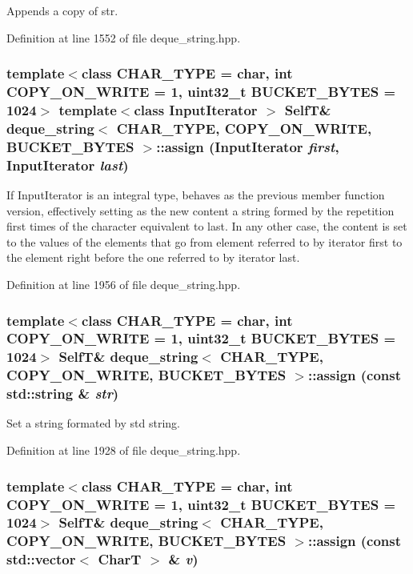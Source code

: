 Appends a copy of str. 

Definition at line 1552 of file deque\_\-string.hpp.\hypertarget{classdeque__string_c5b8af527d69203338e2450164dbdd8c}{
\subsubsection[{assign}]{\setlength{\rightskip}{0pt plus 5cm}template$<$class CHAR\_\-TYPE  = char, int COPY\_\-ON\_\-WRITE = 1, uint32\_\-t BUCKET\_\-BYTES = 1024$>$ template$<$class InputIterator $>$ {\bf SelfT}\& {\bf deque\_\-string}$<$ CHAR\_\-TYPE, COPY\_\-ON\_\-WRITE, BUCKET\_\-BYTES $>$::assign (InputIterator {\em first}, \/  InputIterator {\em last})}}
\label{classdeque__string_c5b8af527d69203338e2450164dbdd8c}


If InputIterator is an integral type, behaves as the previous member function version, effectively setting as the new content a string formed by the repetition first times of the character equivalent to last. In any other case, the content is set to the values of the elements that go from element referred to by iterator first to the element right before the one referred to by iterator last. 

Definition at line 1956 of file deque\_\-string.hpp.\hypertarget{classdeque__string_70d8b09a7c215edb6cf46bb75c6a0302}{
\subsubsection[{assign}]{\setlength{\rightskip}{0pt plus 5cm}template$<$class CHAR\_\-TYPE  = char, int COPY\_\-ON\_\-WRITE = 1, uint32\_\-t BUCKET\_\-BYTES = 1024$>$ {\bf SelfT}\& {\bf deque\_\-string}$<$ CHAR\_\-TYPE, COPY\_\-ON\_\-WRITE, BUCKET\_\-BYTES $>$::assign (const std::string \& {\em str})}}
\label{classdeque__string_70d8b09a7c215edb6cf46bb75c6a0302}


Set a string formated by std string. 

Definition at line 1928 of file deque\_\-string.hpp.\hypertarget{classdeque__string_66230e3dcfe245f877558ffe0fce711a}{
\subsubsection[{assign}]{\setlength{\rightskip}{0pt plus 5cm}template$<$class CHAR\_\-TYPE  = char, int COPY\_\-ON\_\-WRITE = 1, uint32\_\-t BUCKET\_\-BYTES = 1024$>$ {\bf SelfT}\& {\bf deque\_\-string}$<$ CHAR\_\-TYPE, COPY\_\-ON\_\-WRITE, BUCKET\_\-BYTES $>$::assign (const std::vector$<$ CharT $>$ \& {\em v})}}
\label{classdeque__string_66230e3dcfe245f877558ffe0fce711a}



